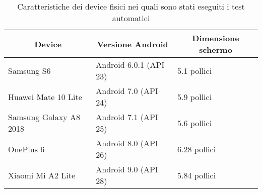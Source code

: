\begin{table}[!h]
\centering
\begin{tabular}{|l|l|l|}
\hline
\multicolumn{1}{|c|}{\textbf{Device}} &
  \multicolumn{1}{c|}{\textbf{Versione Android}} &
  \multicolumn{1}{c|}{\textbf{Dimensione schermo}} \\ \hline
Samsung S6         & Android 6.0.1 (API 23)  & 5.1 pollici  \\ \hline
Huawei Mate 10 Lite & Android 7.0 (API 24) & 5.9 pollici  \\ \hline
Samsung Galaxy A8 2018  & Android 7.1 (API 25)   & 5.6 pollici  \\ \hline
OnePlus 6          & Android 8.0 (API 26)   & 6.28 pollici  \\ \hline
Xiaomi Mi A2 Lite  & Android 9.0 (API 28)   & 5.84 pollici \\ \hline
\end{tabular}%
\caption{Caratteristiche dei device fisici nei quali sono stati eseguiti i test automatici}
\end{table}